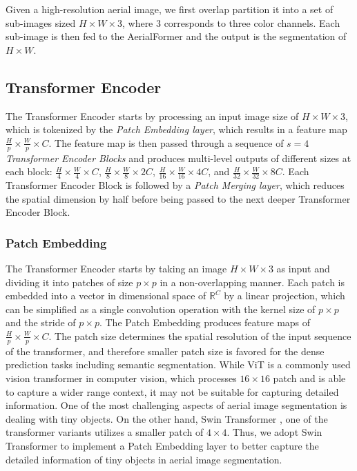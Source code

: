 \documentclass[journal]{IEEEtran}
\begin{document}
Given a high-resolution aerial image, we first overlap partition it into a set of sub-images sized $H \times W \times 3$, where 3 corresponds to three color channels. Each sub-image is then fed to the AerialFormer and the output is the segmentation of $H \times W$. 



\subsection{Transformer Encoder}
\label{TransEnc}

The Transformer Encoder starts by processing an input image size of $H \times W \times 3$, which is tokenized by the \textit{Patch Embedding layer}, which results in a feature map $\frac{H}{p} \times \frac{W}{p} \times C$. The feature map is then passed through a sequence of $s = 4$ \textit{Transformer Encoder Blocks} and produces multi-level outputs of different sizes at each block: $\frac{H}{4} \times \frac{W}{4} \times C$, $\frac{H}{8} \times \frac{W}{8} \times 2C$, $\frac{H}{16} \times \frac{W}{16} \times 4C$, and  $\frac{H}{32} \times \frac{W}{32} \times 8C$. Each Transformer Encoder Block is followed by a \textit{Patch Merging layer}, which reduces the spatial dimension by half before being passed to the next deeper Transformer Encoder Block.



\subsubsection{Patch Embedding}
The Transformer Encoder starts by taking an image $H \times W \times 3$ as input and dividing it into patches of size $p \times p$ in a non-overlapping manner. Each patch is embedded into a vector in dimensional space of $\mathbb{R}^C$ by a linear projection, which can be simplified as a single convolution operation with the kernel size of $p \times p$ and the stride of $p \times p$. The Patch Embedding produces feature maps of $\frac{H}{p} \times \frac{W}{p} \times C$.
The patch size determines the spatial resolution of the input sequence of the transformer, and therefore smaller patch size is favored for the dense prediction tasks including semantic segmentation. While ViT \cite{dosovitskiy2020image} is a commonly used vision transformer in computer vision, which  processes $16 \times 16$ patch and is able to capture a wider range context, it may not be suitable for capturing detailed information. One of the most challenging aspects of aerial image segmentation is dealing with tiny objects. On the other hand, Swin Transformer \cite{liu2021swin}, one of the transformer variants utilizes a smaller patch of $4\times 4$. Thus, we adopt Swin Transformer \cite{liu2021swin} to implement a Patch Embedding layer to better capture the detailed information of tiny objects in aerial image segmentation.
\end{document}
